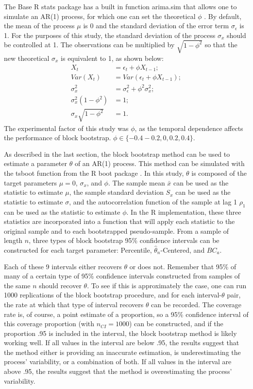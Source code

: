 \documentclass[12pt, letterpaper, titlepage]{article}
\begin{document}
The Base R stats package has a built in function arima.sim that allows one to
simulate an AR(1) process, for which one can set the theoretical $\phi$
\citep{R}. By default, the mean of the process $\mu$ is 0 and the standard
deviation of the error term $\sigma_{\epsilon}$ is 1. For the purposes of this
study, the standard deviation of the process $\sigma_{x}$ should be controlled
at 1. The observations can be multiplied by $\sqrt{1 - \phi^2}$ so that the new
theoretical $\sigma_{x}$ is equivalent to 1, as shown below:
\begin{align}
X_{t} &= \epsilon_{t} + \phi X_{t-1};\\
Var(X_{t}) &= Var(\epsilon_{t} + \phi X_{t-1});\\
\sigma^2_{x} &= \sigma^2_{\epsilon} + \phi^2 \sigma^2_{x};\\
\sigma^2_{x}(1 - \phi^2) &= 1;\\
\sigma_{x}\sqrt{1 - \phi^2} &= 1.
\end{align}
The experimental factor of this study was $\phi$, as the temporal dependence
affects the performance of block bootstrap.
$\phi \in \{-0.4 -0.2, 0, 0.2, 0.4\}$.


As described in the last section, the block bootstrap method can be used to
estimate a parameter $\theta$ of an AR(1) process. This method can be
simulated with the tsboot function from the R boot package \citep{boot}
\citep{davison1997bootstrap}. In this study, $\theta$ is composed of the target parameters
$\mu = 0$, $\sigma_{x}$, and $\phi$. The sample mean $\bar{x}$ can be used as
the statistic to estimate $\mu$, the sample standard deviation $S_x$ can be
used as the statistic to estimate $\sigma$, and the autocorrelation function
of the sample at lag 1 $\rho_1$ can be used as the statistic to estimate
$\phi$. In the R implementation, these three statistics are incorporated into
a function that will apply each statistic to the original sample and to each
bootstrapped pseudo-sample. From a sample of length $n$, three types of block
bootstrap 95\% confidence intervals can be constructed for each target
parameter:
Percentile, $\hat{\theta}_{n}$-Centered,
and $BC_a$.



Each of these 9 intervals either recovers $\theta$ or does not. Remember that
95\% of many of a certain type of 95\% confidence intervals constructed from
samples of the same $n$ should recover $\theta$. To see if this is
approximately the case, one can run 1000 replications of the block bootstrap
procedure, and for each interval-$\theta$ pair, the rate at which that type of
interval recovers $\theta$ can be recorded. The coverage rate is, of course, a
point estimate of a proportion, so a 95\% confidence interval of this coverage
proportion (with $n_{CI} = 1000$) can be constructed, and if the proportion
.95 is included in the interval, the block bootstrap method is likely working
well. If all values in the interval are below .95, the results suggest that the
method either is providing an inaccurate estimation, is underestimating the
process' variability, or a combination of both. If all values in the interval
are above .95, the results suggest that the method is overestimating the
process' variability.
\end{document}
